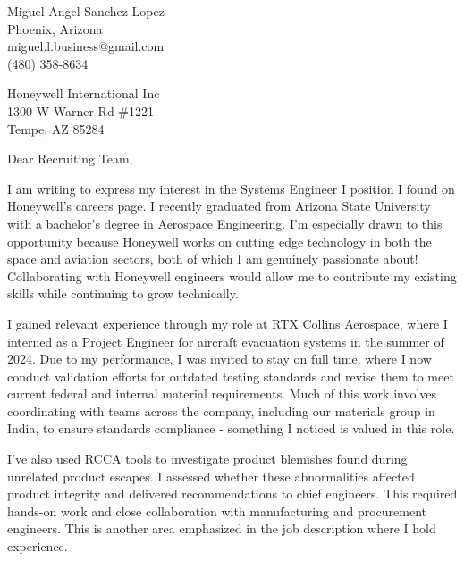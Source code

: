 \documentclass[11pt]{letter}
\begin{document}
	
	\begin{flushright}
		Miguel Angel Sanchez Lopez\\
		Phoenix, Arizona\\
		miguel.l.business@gmail.com\\
		(480) 358-8634 \\
	\end{flushright}
	
	\vspace{0.5em}
	
	\begin{flushleft}
		Honeywell International Inc \\
		1300 W Warner Rd \#1221\\
		Tempe, AZ 85284
	\end{flushleft}
	
	\vspace{0.5em}
	
	Dear Recruiting Team,
	
	I am writing to express my interest in the Systems Engineer I position I found on Honeywell’s careers page. I recently graduated from Arizona State University with a bachelor’s degree in Aerospace Engineering. I’m especially drawn to this opportunity because Honeywell works on cutting edge technology in both the space and aviation sectors, both of which I am genuinely passionate about! Collaborating with Honeywell engineers would allow me to contribute my existing skills while continuing to grow technically.
	
	I gained relevant experience through my role at RTX Collins Aerospace, where I interned as a Project Engineer for aircraft evacuation systems in the summer of 2024. Due to my performance, I was invited to stay on full time, where I now conduct validation efforts for outdated testing standards and revise them to meet current federal and internal material requirements. Much of this work involves coordinating with teams across the company, including our materials group in India, to ensure standards compliance - something I noticed is valued in this role.
	
	I’ve also used RCCA tools to investigate product blemishes found during unrelated product escapes. I assessed whether these abnormalities affected product integrity and delivered recommendations to chief engineers. This required hands-on work and close collaboration with manufacturing and procurement engineers. This is another area emphasized in the job description where I hold experience.
	
\end{document}

